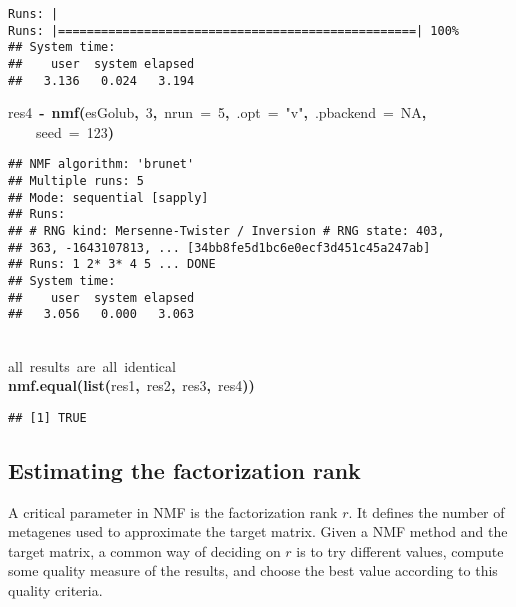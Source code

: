 \documentclass[a4paper]{article}\usepackage{graphicx, color}
\makeatletter
\newcommand{\hlnumber}[1]{\textcolor[rgb]{0,0,0}{#1}}%
\newcommand{\hlfunctioncall}[1]{\textcolor[rgb]{0.501960784313725,0,0.329411764705882}{\textbf{#1}}}%
\newcommand{\hlstring}[1]{\textcolor[rgb]{0.6,0.6,1}{#1}}%
\newcommand{\hlkeyword}[1]{\textcolor[rgb]{0,0,0}{\textbf{#1}}}%
\newcommand{\hlargument}[1]{\textcolor[rgb]{0.690196078431373,0.250980392156863,0.0196078431372549}{#1}}%
\newcommand{\hlcomment}[1]{\textcolor[rgb]{0.180392156862745,0.6,0.341176470588235}{#1}}%
\newcommand{\hlassignement}[1]{\textcolor[rgb]{0,0,0}{\textbf{#1}}}%
\newcommand{\hlsymbol}[1]{\textcolor[rgb]{0,0,0}{#1}}%
\newcommand{\hlstd}[1]{\textcolor[rgb]{0,0,0}{#1}}%
\newenvironment{kframe}{%
 \def\FrameCommand##1{\hskip\@totalleftmargin \hskip-\fboxsep
 \colorbox{shadecolor}{##1}\hskip-\fboxsep
     \hskip-\linewidth \hskip-\@totalleftmargin \hskip\columnwidth}%
 \MakeFramed {\advance\hsize-\width
   \@totalleftmargin\z@ \linewidth\hsize
   \@setminipage}}%
 {\par\unskip\endMakeFramed}
\newenvironment{knitrout}{}{} %
\makeatother
\begin{document}
\begin{knitrout}
\begin{kframe}
\begin{verbatim}
Runs: |                                                        
Runs: |==================================================| 100%
## System time:
##    user  system elapsed 
##   3.136   0.024   3.194 
\end{verbatim}
\begin{flushleft}
\ttfamily\noindent
\hlsymbol{res4}{\ }\hlassignement{\usebox{\hlnormalsizeboxlessthan}-}{\ }\hlfunctioncall{nmf}\hlkeyword{(}\hlsymbol{esGolub}\hlkeyword{,}{\ }\hlnumber{3}\hlkeyword{,}{\ }\hlargument{nrun}{\ }\hlargument{=}{\ }\hlnumber{5}\hlkeyword{,}{\ }\hlargument{.opt}{\ }\hlargument{=}{\ }\hlstring{"{}v"{}}\hlkeyword{,}{\ }\hlargument{.pbackend}{\ }\hlargument{=}{\ }\hlnumber{NA}\hlkeyword{,}\hspace*{\fill}\\
\hlstd{}{\ }{\ }{\ }{\ }\hlargument{seed}{\ }\hlargument{=}{\ }\hlnumber{123}\hlkeyword{)}\mbox{}
\normalfont
\end{flushleft}
\begin{verbatim}
## NMF algorithm: 'brunet'
## Multiple runs: 5
## Mode: sequential [sapply]
## Runs:
## # RNG kind: Mersenne-Twister / Inversion # RNG state: 403,
## 363, -1643107813, ... [34bb8fe5d1bc6e0ecf3d451c45a247ab]
## Runs: 1 2* 3* 4 5 ... DONE
## System time:
##    user  system elapsed 
##   3.056   0.000   3.063 
\end{verbatim}
\begin{flushleft}
\ttfamily\noindent
\hspace*{\fill}\\
\hlstd{}\hlcomment{\usebox{\hlnormalsizeboxhash}{\ }all{\ }results{\ }are{\ }all{\ }identical}\hspace*{\fill}\\
\hlstd{}\hlfunctioncall{nmf.equal}\hlkeyword{(}\hlfunctioncall{list}\hlkeyword{(}\hlsymbol{res1}\hlkeyword{,}{\ }\hlsymbol{res2}\hlkeyword{,}{\ }\hlsymbol{res3}\hlkeyword{,}{\ }\hlsymbol{res4}\hlkeyword{)}\hlkeyword{)}\mbox{}
\normalfont
\end{flushleft}
\begin{verbatim}
## [1] TRUE
\end{verbatim}
\end{kframe}
\end{knitrout}



\subsection{Estimating the factorization rank}
A critical parameter in NMF is the factorization rank $r$. 
It defines the number of metagenes used to approximate the target matrix.
Given a NMF method and the target matrix, a common way of deciding on $r$ is to try different values, compute some quality measure of the results, and choose the best value according to this quality criteria.
\end{document}
